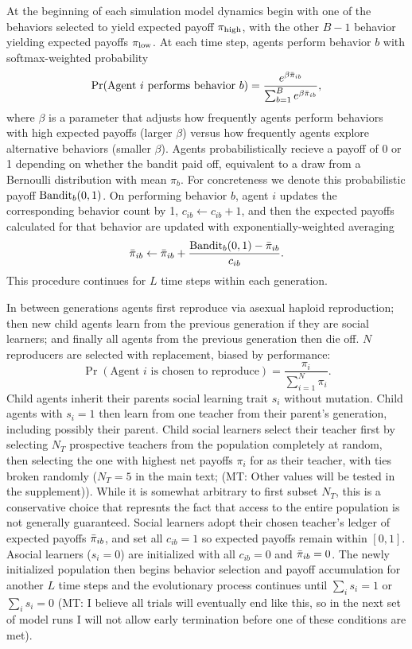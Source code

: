 \documentclass[letterpaper,11.5pt]{scrartcl}
\newcommand{\mt}[1]{{\textcolor{myorange} {({\tiny MT:} #1)}}}
\begin{document}
At the beginning of each simulation model dynamics begin with 
one of the behaviors selected to 
yield expected payoff $\pi_{\mathrm{high}}$, with the other $B-1$ behavior yielding
expected payoffs $\pi_{\mathrm{low}}$. At each time step, agents perform behavior $b$ 
with softmax-weighted probability
\begin{equation}
  \Pr(\text{Agent $i$ performs behavior $b$}) = 
    \frac{e^{\beta \bar\pi_{ib}}}{\sum_{b=1}^B e^{\beta \bar\pi_{ib}}},
\end{equation}
\noindent
where $\beta$ is a parameter that adjusts how frequently agents perform 
behaviors with high expected payoffs (larger $\beta$) versus how frequently
agents explore alternative behaviors (smaller $\beta$). 
Agents probabilistically recieve a payoff of 0 or 1 depending on whether the
bandit paid off, equivalent to a draw from a Bernoulli distribution with 
mean $\pi_b$. For concreteness we denote this probabilistic payoff
$\text{Bandit}_b(0, 1)$. On performing behavior $b$, agent $i$ updates the
corresponding behavior count by 1, $c_{ib} \leftarrow c_{ib} + 1$, and then
the expected payoffs calculated for that behavior are updated with
exponentially-weighted averaging
\begin{equation}
  \bar\pi_{ib} \leftarrow \bar\pi_{ib} + \frac{\text{Bandit}_b(0, 1) - \bar\pi_{ib}}{c_{ib}}.
\end{equation}
\noindent
This procedure continues for $L$ time steps within each generation.

In between generations agents first reproduce via asexual haploid reproduction; 
then new child agents learn from the
previous generation if they are social learners; and finally all agents from the
previous generation then die off. $N$ reproducers are selected with replacement, 
biased by performance:
\begin{equation}
  \Pr(\text{Agent $i$ is chosen to reproduce}) = \frac{\pi_i}{\sum_{i=1}^N \pi_i}.
\end{equation}
\noindent
Child agents inherit their parents social learning trait $s_i$ without mutation.
Child agents with $s_i = 1$ then learn from one teacher from their parent's
generation, including possibly their parent. Child social learners select
their teacher first by selecting $N_T$ prospective teachers from the 
population completely at random, then selecting the one with highest
net payoffs $\pi_i$ for as their teacher, with ties broken randomly 
($N_T = 5$ in the main text;
\mt{Other values will be tested in the supplement}). While it is somewhat
arbitrary to first subset $N_T$, this is a conservative choice that
represnts the fact that access to the entire population is not generally
guaranteed. Social learners adopt their chosen teacher's ledger of 
expected payoffs $\bar\pi_{ib}$, and set
all $c_{ib} = 1$ so expected payoffs remain within $[0, 1]$. 
Asocial learners ($s_i = 0$) are initialized with all $c_{ib} = 0$ and
$\bar\pi_{ib} = 0$. The newly initialized population then begins behavior selection
and payoff accumulation for another $L$ time steps and the evolutionary process
continues until $\sum_i s_i = 1$ or $\sum_i s_i = 0$ \mt{I believe
all trials will eventually end like this, so in the next set of model runs I will
not allow early termination before one of these conditions are met}.
\end{document}
